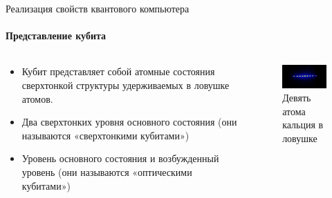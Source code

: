 \documentclass{beamer}
\begin{document}



    \begin{frame}{Реализация свойств квантового компьютера}
    \framesubtitle{Представление кубита}

        \begin{columns}

        \begin{column}{0.6\textwidth}

            \begin{itemize}
                \item <1-> Кубит представляет собой атомные состояния сверхтонкой структуры удерживаемых в ловушке атомов. 
                \item <2-> Два сверхтонких уровня основного состояния (они называются «сверхтонкими кубитами»)
                \item <3-> Уровень основного состояния и возбужденный уровень (они называются «оптическими кубитами»)
            \end{itemize}

        \end{column}

        \begin{column}{0.4\textwidth}
            \begin{figure}
                \centering
                \includegraphics[width=\textwidth]{media/nine-calcium-ions.jpg}
                \caption{Девять атома кальция в ловушке}
            \end{figure}
        \end{column}

        \end{columns}
    \end{frame}
\end{document}
